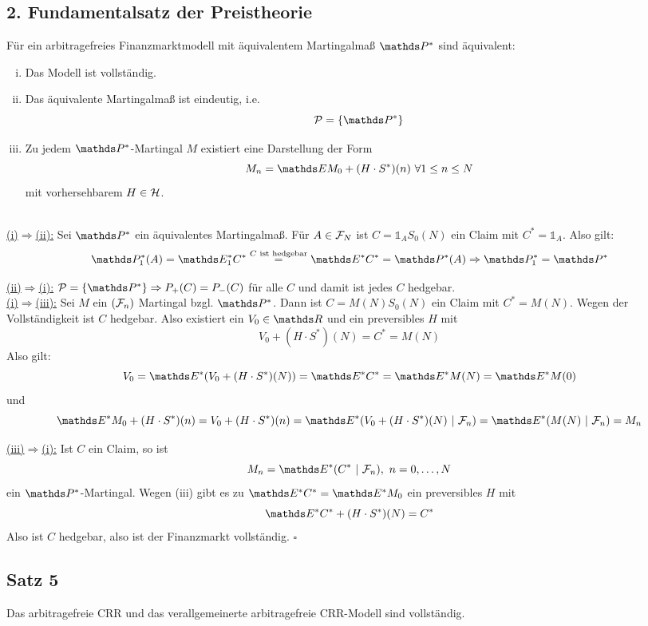 \subsection{2. Fundamentalsatz der Preistheorie}
\label{sub:2_fundamentalsatz_preistheorie}
Für ein arbitragefreies Finanzmarktmodell mit äquivalentem Martingalmaß $\Pw^*$ sind äquivalent:
\begin{enumerate}[(i)]
	\item Das Modell ist vollständig.
	\item Das äquivalente Martingalmaß ist eindeutig, i.e.
	\[
	\mc{P}=\penbrace{\Pw^*}
	\]
	\item Zu jedem $\Pw^*$-Martingal $M$ existiert eine Darstellung der Form
	\[
	M_n=\E M_0 + (H\cdot S^*)(n) ~\forall 1\le n\le N
	\]
	mit vorhersehbarem $H\in\mathcal{H}$.
\end{enumerate}

\\
\uline{(i)$\Rightarrow$(ii):}
Sei $\Pw^*$ ein äquivalentes Martingalmaß.
Für $A\in \mathcal{F}_N$ ist $C=\mathbb{1}_A S_0(N)$ ein Claim mit $C^*=\mathbb{1}_A$.
Also gilt:
\[
\Pw_1^*(A)=\E_1^*C^*\stackrel{C\text{ ist hedgebar}}{=} \E^*C^*=\Pw^*(A) \Rightarrow \Pw_1^*=\Pw^*
\]

\uline{(ii)$\Rightarrow$(i):}
$\mc{P}=\penbrace{\Pw^*}\Rightarrow P_+(C)=P_-(C)$ für alle $C$ und damit ist jedes $C$ hedgebar.\\

\uline{(i)$\Rightarrow$(iii):}
Sei $M$ ein $(\mathcal{F}_n)$ Martingal bzgl. $\Pw^*$.
Dann ist $C=M(N)S_0(N)$ ein Claim mit $C^*=M(N)$.
Wegen der Vollständigkeit ist $C$ hedgebar.
Also existiert ein $V_0\in \R$ und ein preversibles $H$ mit 
\[
V_0+(H\cdot S^*)(N)=C^*=M(N)
\]
Also gilt:
\[
V_0=\E^*(V_0+(H\cdot S^*)(N))=\E^*C^*=\E^* M(N)=\E^* M(0)
\]
und
\[
\E^* M_0+ (H\cdot S^*)(n)=V_0+(H\cdot S^*)(n)= \E^*(V_0+(H\cdot S^*)(N)~|~\F_n)=\E^*(M(N)~|~\F_n)=M_n
\]

\uline{(iii)$\Rightarrow$(i):}
Ist $C$ ein Claim, so ist
\[
M_n=\E^*(C^*~|~\F_n),~n=0\dt{,}N
\]
ein $\Pw^*$-Martingal.
Wegen (iii) gibt es zu $\E^*C^*=\E^*M_0$ ein preversibles $H$ mit
\[
\E^*C^*+(H\cdot S^*)(N)=C^*
\]
Also ist $C$ hedgebar, also ist der Finanzmarkt vollständig.
\hfill $\square$

\subsection{Satz 5}
\label{sub:satz_5fima}
Das arbitragefreie CRR und das verallgemeinerte arbitragefreie CRR-Modell sind vollständig.\\

